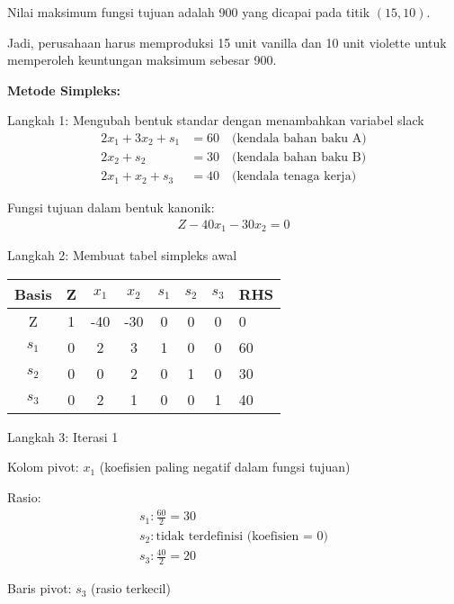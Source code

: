 \documentclass[12pt,a4paper]{article}
\begin{document}
\begin{enumerate}
    Nilai maksimum fungsi tujuan adalah 900 yang dicapai pada titik $(15,10)$.
    
    Jadi, perusahaan harus memproduksi 15 unit vanilla dan 10 unit violette untuk memperoleh keuntungan maksimum sebesar 900.
    
    \textbf{Metode Simpleks:}
    
    Langkah 1: Mengubah bentuk standar dengan menambahkan variabel slack
    \begin{align*}
    2x_1 + 3x_2 + s_1 &= 60 \quad \text{(kendala bahan baku A)}\\  
    2x_2 + s_2 &= 30 \quad \text{(kendala bahan baku B)}\\  
    2x_1 + x_2 + s_3 &= 40 \quad \text{(kendala tenaga kerja)}
    \end{align*}
    
    Fungsi tujuan dalam bentuk kanonik:
    \begin{align*}
    Z - 40x_1 - 30x_2 = 0
    \end{align*}
    
    Langkah 2: Membuat tabel simpleks awal
    
    \begin{table}[H]
    \centering
    \begin{tabular}{|c|c|c|c|c|c|c|}
    \hline
    Basis & Z & $x_1$ & $x_2$ & $s_1$ & $s_2$ & $s_3$ & RHS \\
    \hline
    Z & 1 & -40 & -30 & 0 & 0 & 0 & 0 \\
    $s_1$ & 0 & 2 & 3 & 1 & 0 & 0 & 60 \\
    $s_2$ & 0 & 0 & 2 & 0 & 1 & 0 & 30 \\
    $s_3$ & 0 & 2 & 1 & 0 & 0 & 1 & 40 \\
    \hline
    \end{tabular}
    \end{table}
    
    Langkah 3: Iterasi 1
    
    Kolom pivot: $x_1$ (koefisien paling negatif dalam fungsi tujuan)
    
    Rasio:
    \begin{align*}
    s_1: \frac{60}{2} = 30\\  
    s_2: \text{tidak terdefinisi (koefisien = 0)}\\  
    s_3: \frac{40}{2} = 20
    \end{align*}
    
    Baris pivot: $s_3$ (rasio terkecil)
    

\end{enumerate}
\end{document}
